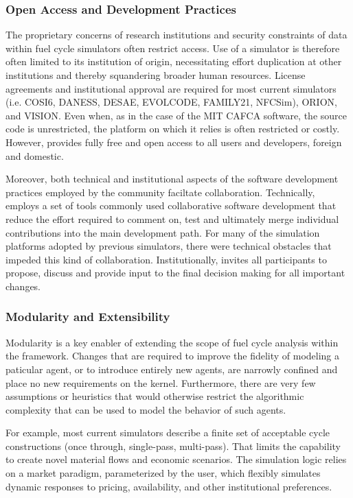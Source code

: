 
\subsubsection{Open Access and Development Practices}

The proprietary concerns of research institutions and security constraints of
data within fuel cycle simulators often restrict access. Use of a simulator is
therefore often limited to its institution of origin, necessitating effort
duplication at other institutions and thereby squandering broader human
resources. License agreements and institutional approval are required for most
current simulators (i.e. \gls{COSI}6, \gls{DANESS}, \gls{DESAE}, EVOLCODE,
FAMILY21, \gls{NFCSim})\cite{juchau_modeling_2010}, ORION, and \gls{VISION}.  Even when, as in
the case of the MIT \gls{CAFCA} software, the source code is unrestricted, the
platform on which it relies is often restricted or costly.  However, \Cyclus
provides fully free and open access to all users
and developers, foreign and domestic.

Moreover, both technical and institutional aspects of the software development
practices employed by the \Cyclus community faciltate collaboration.
Technically, \Cyclus employs a set of tools commonly used collaborative
software development that reduce the effort required to comment on, test and
ultimately merge individual contributions into the main development path.
For many of the simulation platforms adopted by previous simulators, there were
technical obstacles that impeded this kind of collaboration.
Institutionally, \Cyclus invites all participants to propose, discuss and
provide input to the final decision making for all important changes.

\subsubsection{Modularity and Extensibility}

Modularity is a key enabler of extending the scope of fuel cycle analysis
within the \Cyclus framework.  Changes that are required to improve the
fidelity of modeling a paticular agent, or to introduce entirely new agents,
are narrowly confined and place no new requirements on the \Cyclus kernel.
Furthermore, there are very few assumptions or heuristics that would otherwise
restrict the algorithmic complexity that can be used to model the behavior of
such agents.

For example, most current simulators describe a finite set of acceptable cycle
constructions (once through, single-pass, multi-pass). That limits the
capability to create novel material flows and economic scenarios. The \Cyclus
simulation logic relies on a market paradigm, parameterized by the user, which
flexibly simulates dynamic responses to pricing, availability, and other
institutional preferences.

